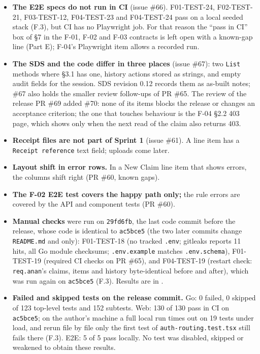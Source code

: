 \begin{itemize}\setlength\itemsep{2pt}
\item \textbf{The E2E specs do not run in CI} (issue \#66). F01-TEST-24, F02-TEST-21, F03-TEST-12, F04-TEST-23 and F04-TEST-24 pass on a local seeded stack (F.3), but CI has no Playwright job. For that reason the ``pass in CI'' box of \S7 in the F-01, F-02 and F-03 contracts is left open with a known-gap line (Part E); F-04's Playwright item allows a recorded run.
\item \textbf{The SDS and the code differ in three places} (issue \#67): two \texttt{List} methods where \S3.1 has one, history actions stored as strings, and empty audit fields for the session. SDS revision 0.12 records them as as-built notes; \#67 also holds the smaller review follow-ups of PR \#65. The review of the release PR \#69 added \#70: none of its items blocks the release or changes an acceptance criterion; the one that touches behaviour is the F-04 \S2.2 403 page, which shows only when the next read of the claim also returns 403.
\item \textbf{Receipt files are not part of Sprint 1} (issue \#61). A line item has a \texttt{Receipt reference} text field; uploads come later.
\item \textbf{Layout shift in error rows.} In a New Claim line item that shows errors, the columns shift right (PR \#60, known gaps).
\item \textbf{The F-02 E2E test covers the happy path only;} the rule errors are covered by the API and component tests (PR \#60).
\item \textbf{Manual checks} were run on \texttt{29fd6fb}, the last code commit before the release, whose code is identical to \texttt{ac5bce5} (the two later commits change \texttt{README.md} and  only): F01-TEST-18 (no tracked \texttt{.env}; gitleaks reports 11 hits, all Go module checksums; \texttt{.env.example} matches \texttt{.env.schema}), F01-TEST-19 (required CI checks on PR \#65), and F04-TEST-19 (restart check: \texttt{req.anan}'s claims, items and history byte-identical before and after), which was run again on \texttt{ac5bce5} (F.3). Results are in .
\item \textbf{Failed and skipped tests on the release commit.} Go: 0 failed, 0 skipped of 123 top-level tests and 152 subtests. Web: 130 of 130 pass in CI on \texttt{ac5bce5}; on the author's machine a full local run times out on 19 tests under load, and rerun file by file only the first test of \texttt{auth-routing.test.tsx} still fails there (F.3). E2E: 5 of 5 pass locally. No test was disabled, skipped or weakened to obtain these results.
\end{itemize}

